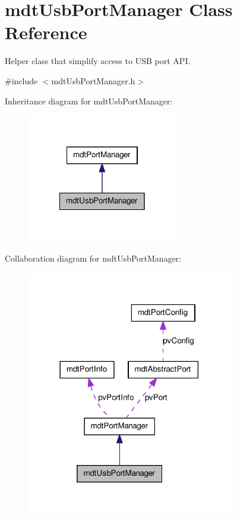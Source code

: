 \hypertarget{classmdt_usb_port_manager}{
\section{mdtUsbPortManager Class Reference}
\label{classmdt_usb_port_manager}
}


Helper class that simplify access to USB port API.  




{\ttfamily \#include $<$mdtUsbPortManager.h$>$}



Inheritance diagram for mdtUsbPortManager:
\nopagebreak
\begin{figure}[H]
\begin{center}
\leavevmode
\includegraphics[width=186pt]{classmdt_usb_port_manager__inherit__graph}
\end{center}
\end{figure}


Collaboration diagram for mdtUsbPortManager:
\nopagebreak
\begin{figure}[H]
\begin{center}
\leavevmode
\includegraphics[width=254pt]{classmdt_usb_port_manager__coll__graph}
\end{center}
\end{figure}

